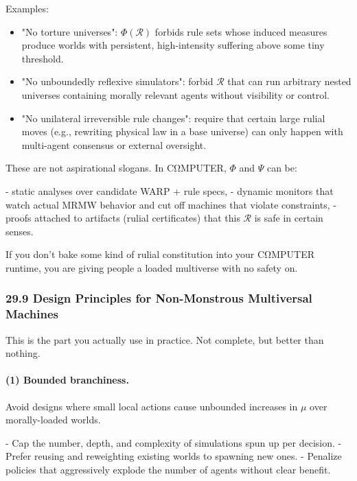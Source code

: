 Examples:

\begin{itemize}
  \item "No torture universes": $\Phi(\mathcal{R})$ forbids rule sets whose induced measures produce worlds with persistent, high-intensity suffering above some tiny threshold.

  \item "No unboundedly reflexive simulators": forbid $\mathcal{R}$ that can run arbitrary nested universes containing morally relevant agents without visibility or control.

  \item "No unilateral irreversible rule changes": require that certain large rulial moves (e.g., rewriting physical law in a base universe) can only happen with multi-agent consensus or external oversight.
\end{itemize}

These are not aspirational slogans. In CΩMPUTER, $\Phi$ and $\Psi$ can be:

- static analyses over candidate WARP + rule specs,
- dynamic monitors that watch actual MRMW behavior and cut off machines that violate constraints,
- proofs attached to artifacts (rulial certificates) that this $\mathcal{R}$ is safe in certain senses.

If you don’t bake some kind of rulial constitution into your CΩMPUTER runtime, you are giving people a loaded multiverse with no safety on.

\subsubsection*{29.9  Design Principles for Non-Monstrous Multiversal Machines}

This is the part you actually use in practice.
Not complete, but better than nothing.

\paragraph{(1) Bounded branchiness.}

Avoid designs where small local actions cause unbounded increases in $\mu$ over morally-loaded worlds.

- Cap the number, depth, and complexity of simulations spun up per decision.
- Prefer reusing and reweighting existing worlds to spawning new ones.
- Penalize policies that aggressively explode the number of agents without clear benefit.

